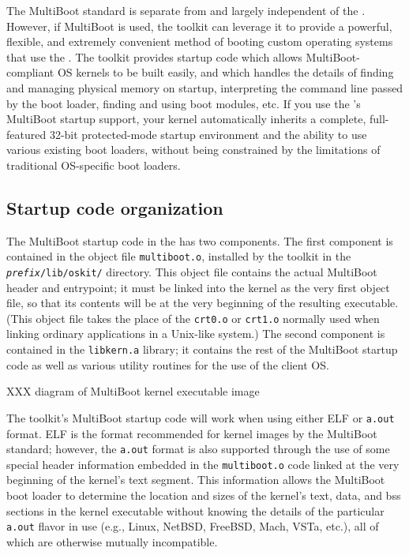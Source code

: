 The MultiBoot standard
is separate from and largely independent of the \oskit{}.
However, if MultiBoot is used, the toolkit can leverage it
to provide a powerful, flexible, and extremely convenient method
of booting custom operating systems that use the \oskit{}.
The toolkit provides startup code
which allows MultiBoot-compliant OS kernels to be built easily,
and which handles the details of
finding and managing physical memory on startup,
interpreting the command line passed by the boot loader,
finding and using boot modules, etc.
If you use the \oskit{}'s MultiBoot startup support,
your kernel automatically inherits
a complete, full-featured 32-bit protected-mode startup environment
and the ability to use various existing boot loaders,
without being constrained by the limitations
of traditional OS-specific boot loaders.

\subsection{Startup code organization}

The MultiBoot startup code in the \oskit{} has two components.
The first component is contained in the object file {\tt multiboot.o},
installed by the toolkit in the {\tt \emph{prefix}/lib/oskit/} directory.
This object file contains the actual MultiBoot header and entrypoint;
it must be linked into the kernel as the very first object file,
so that its contents will be at the very beginning of the resulting executable.
(This object file takes the place of the {\tt crt0.o} or {\tt crt1.o}
normally used when linking ordinary applications in a Unix-like system.)
The second component is contained in the {\tt libkern.a} library;
it contains the rest of the MultiBoot startup code
as well as various utility routines for the use of the client OS.

XXX diagram of MultiBoot kernel executable image

The toolkit's MultiBoot startup code will work
when using either ELF or {\tt a.out} format.
ELF is the format recommended for kernel images by the MultiBoot standard;
however, the {\tt a.out} format is also supported
through the use of some special header information
embedded in the {\tt multiboot.o} code
linked at the very beginning of the kernel's text segment.
This information allows the MultiBoot boot loader
to determine the location and sizes
of the kernel's text, data, and bss sections in the kernel executable
without knowing the details of the particular {\tt a.out} flavor in use
(e.g., Linux, NetBSD, FreeBSD, Mach, VSTa, etc.),
all of which are otherwise mutually incompatible.

